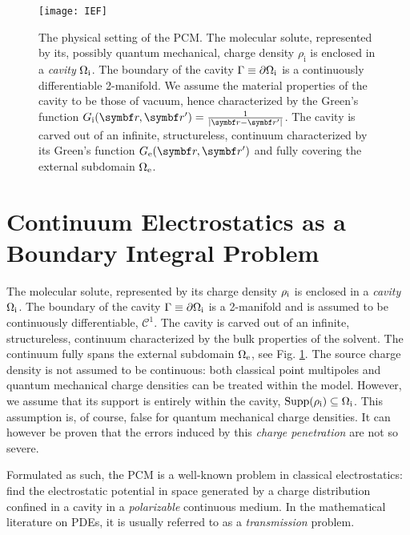 \begin{figure}[!h]
  \centering
  \texttt{[image: IEF]}
  \caption[The physical setting of the polarizable continuum model.]{
  The physical setting of the \gls{PCM}. The molecular solute,
  represented by its, possibly quantum mechanical, charge density
  $\rho_\mathrm{i}$ is enclosed in a \emph{cavity} $\Omega_\mathrm{i}$.
  The boundary of the cavity $\Gamma\equiv\partial\Omega_\mathrm{i}$ is a
  continuously differentiable 2-manifold.
  We assume the material properties of the cavity to be those of vacuum,
  hence characterized by the Green's function
  $\Gi=\frac{1}{|\vect{r}-\vect{r}^\prime|}$.
  The cavity is carved out of an infinite, structureless, continuum
  characterized by its Green's function $\Ge$ and fully covering the
  external subdomain $\Omega_\mathrm{e}$.
  }
  \label{fig:IEF}
\end{figure}

\section{Continuum Electrostatics as a Boundary Integral Problem}\label{sec:IEF}

The molecular solute, represented by its charge density
$\rho_\mathrm{i}$ is enclosed in a \emph{cavity} $\Omega_\mathrm{i}$.
The boundary of the cavity $\Gamma\equiv\partial\Omega_\mathrm{i}$ is a
2-manifold and is assumed to be continuously differentiable, \ie $\mathcal{C}^1$.
The cavity is carved out of an infinite, structureless, continuum
characterized by the bulk properties of the solvent.
The continuum fully spans the external subdomain $\Omega_\mathrm{e}$, see Fig. \ref{fig:IEF}.
The source charge density is not assumed to be continuous: both
classical point multipoles and quantum mechanical charge densities can
be treated within the model.
However, we assume that its support is entirely within the cavity,
$\mathop{}\!\mathrm{Supp}(\rho_\mathrm{i}) \subseteq \Omega_\mathrm{i}$. This assumption is, of course, false
for quantum mechanical charge densities. It can however be proven that
the errors induced by this \emph{charge penetration} are not so
severe.~\autocite{Chipman2000-us, Cances2001-qs, Cances2001-qn}

Formulated as such, the \gls*{PCM} is a well-known problem in classical
electrostatics: find the electrostatic potential in space generated by
a charge distribution confined in a cavity in a \emph{polarizable}
continuous medium.\autocite{Jackson1999, Vanderlinde2005-gf}
In the mathematical literature on \acp{PDE}, it is usually referred to as a
\emph{transmission} problem.\autocite{Hackbusch1995-uq, Sauter2011-an}

